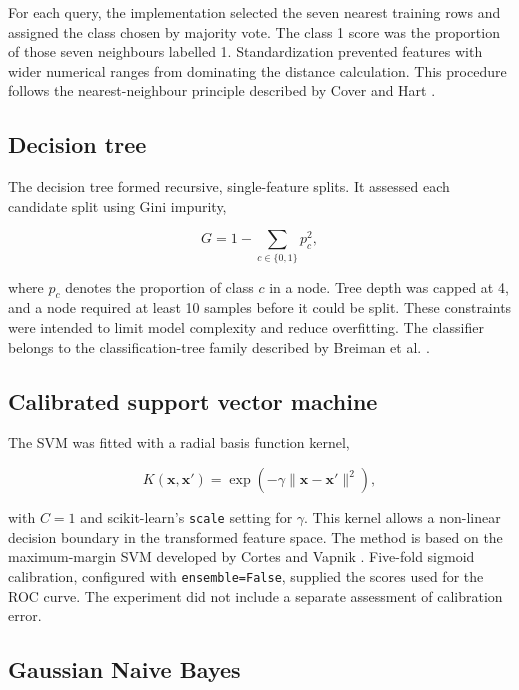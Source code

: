 \documentclass[pdflatex,sn-vancouver-num]{sn-jnl}
\begin{document}
For each query, the implementation selected the seven nearest training rows and assigned the class chosen by majority vote. The class 1 score was the proportion of those seven neighbours labelled 1. Standardization prevented features with wider numerical ranges from dominating the distance calculation. This procedure follows the nearest-neighbour principle described by Cover and Hart \cite{cover1967nearest}.

\subsection{Decision tree}\label{subsec:tree}

The decision tree formed recursive, single-feature splits. It assessed each candidate split using Gini impurity,

\begin{equation}
G = 1-\sum_{c\in\{0,1\}}p_c^2,
\label{eq:gini}
\end{equation}

where $p_c$ denotes the proportion of class $c$ in a node. Tree depth was capped at 4, and a node required at least 10 samples before it could be split. These constraints were intended to limit model complexity and reduce overfitting. The classifier belongs to the classification-tree family described by Breiman et al. \cite{breiman1984cart}.

\subsection{Calibrated support vector machine}\label{subsec:svm}

The SVM was fitted with a radial basis function kernel,

\begin{equation}
K(\mathbf{x},\mathbf{x}')=\exp\left(-\gamma\lVert\mathbf{x}-\mathbf{x}'\rVert^2\right),
\label{eq:rbf}
\end{equation}

with $C=1$ and scikit-learn's \texttt{scale} setting for $\gamma$. This kernel allows a non-linear decision boundary in the transformed feature space. The method is based on the maximum-margin SVM developed by Cortes and Vapnik \cite{cortes1995svm}. Five-fold sigmoid calibration, configured with \texttt{ensemble=False}, supplied the scores used for the ROC curve. The experiment did not include a separate assessment of calibration error.

\subsection{Gaussian Naive Bayes}\label{subsec:nb}
\end{document}
